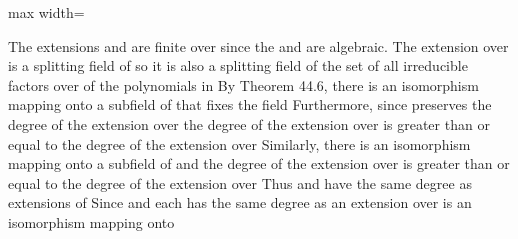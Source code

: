 \documentclass[11pt,oneside]{article}
\begin{document}
\begin{BookBody}
\begin{center}\begin{adjustbox}{max width=\linewidth}\end{adjustbox}\end{center}

\noindent The extensions  and  are finite over  since the  and  are algebraic. The extension  over  is a splitting field of  so it is also a splitting field of  the set of all irreducible factors over  of the polynomials in  By Theorem 44.6, there is an isomorphism \BookInline{\tau } mapping  onto a subfield of  that fixes the field  Furthermore, since \BookInline{\tau } preserves the degree of the extension over  the degree of the extension  over  is greater than or equal to the degree of the extension  over  Similarly, there is an isomorphism mapping  onto a subfield of  and the degree of the extension  over  is greater than or equal to the degree of the extension  over  Thus  and  have the same degree as extensions of  Since  and each has the same degree as an extension over  is an isomorphism mapping  onto \BookEnd{\blacklozenge}

\end{BookBody}

\BookNarrativetrue
\end{document}
